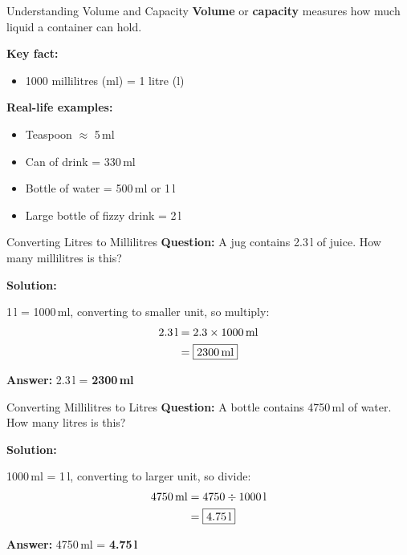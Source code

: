 \documentclass[12pt,a4paper]{article}
\begin{document}
\begin{conceptbox}{Understanding Volume and Capacity}
\textbf{Volume} or \textbf{capacity} measures how much liquid a container can hold.

\begin{center}
\end{center}

\textbf{Key fact:}
\begin{itemize}[leftmargin=*]
\item 1000 millilitres (ml) = 1 litre (l)
\end{itemize}

\textbf{Real-life examples:}
\begin{itemize}[leftmargin=*]
\item Teaspoon $\approx$ 5\,ml
\item Can of drink = 330\,ml
\item Bottle of water = 500\,ml or 1\,l
\item Large bottle of fizzy drink = 2\,l
\end{itemize}
\end{conceptbox}


\begin{examplebox}{Converting Litres to Millilitres}
\textbf{Question:} A jug contains 2.3\,l of juice. How many millilitres is this?

\textbf{Solution:}

1\,l = 1000\,ml, converting to smaller unit, so multiply:
\begin{align*}
2.3\text{\,l} &= 2.3 \times 1000\text{\,ml} \\
&= \boxed{2300\text{\,ml}}
\end{align*}

\textbf{Answer:} 2.3\,l = \textbf{2300\,ml}
\end{examplebox}

\begin{examplebox}{Converting Millilitres to Litres}
\textbf{Question:} A bottle contains 4750\,ml of water. How many litres is this?

\textbf{Solution:}

1000\,ml = 1\,l, converting to larger unit, so divide:
\begin{align*}
4750\text{\,ml} &= 4750 \div 1000\text{\,l} \\
&= \boxed{4.75\text{\,l}}
\end{align*}

\textbf{Answer:} 4750\,ml = \textbf{4.75\,l}
\end{examplebox}
\end{document}
